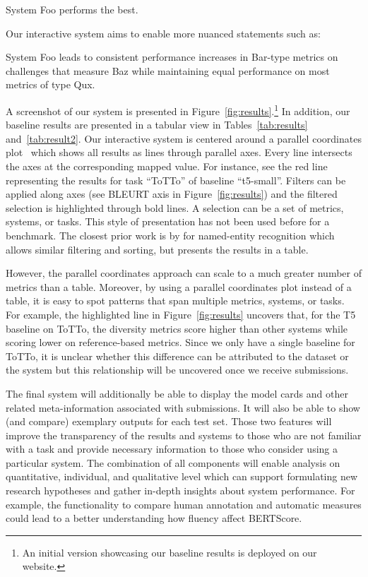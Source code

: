 \documentclass[11pt,a4paper]{article}
\begin{document}
\begin{displayquote}
System Foo performs the best.
\end{displayquote}

\noindent Our interactive system aims to enable more nuanced statements such as:

\begin{displayquote}
System Foo leads to consistent performance increases in Bar-type metrics on challenges that measure Baz while maintaining equal performance on most metrics of type Qux.
\end{displayquote}

\noindent A screenshot of our system is presented in Figure~\ref{fig:results}.\footnote{An initial version showcasing our baseline results is deployed on our website.} In addition, our baseline results are presented in a tabular view in Tables~\ref{tab:results} and~\ref{tab:result2}. 
Our interactive system is centered around a parallel coordinates plot~\citep{inselberg1985plane} which shows all results as lines through parallel axes. Every line intersects the axes at the corresponding mapped value. For instance, see the red line representing the results for task ``ToTTo'' of baseline ``t5-small''. Filters can be applied along axes (see BLEURT axis in Figure~\ref{fig:results}) and the filtered selection is highlighted through bold lines. A selection can be a set of metrics, systems, or tasks. This style of presentation has not been used before for a benchmark. The closest prior work is by \citet{fu-2020-interpretable} for named-entity recognition which allows similar filtering and sorting, but presents the results in a table. 

However, the parallel coordinates approach can scale to a much greater number of metrics than a table. Moreover, by using a parallel coordinates plot instead of a table, it is easy to spot patterns that span multiple metrics, systems, or tasks. 
For example, the highlighted line in Figure~\ref{fig:results} uncovers that, for the T5 baseline on ToTTo, the diversity metrics score higher than other systems while scoring lower on reference-based metrics. Since we only have a single baseline for ToTTo, it is unclear whether this difference can be attributed to the dataset or the system but this relationship will be uncovered once we receive submissions.

The final system will additionally be able to display the model cards and other related meta-information associated with submissions. It will also be able to show (and compare) exemplary outputs for each test set. Those two features will improve the transparency of the results and systems to those who are not familiar with a task and provide necessary information to those who consider using a particular system.
The combination of all components will enable analysis on quantitative, individual, and qualitative level which can support formulating new research hypotheses and gather in-depth insights about system performance. For example, the functionality to compare human annotation and automatic measures could lead to a better understanding how fluency affect BERTScore.
\end{document}
